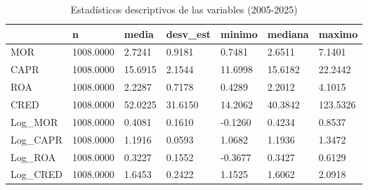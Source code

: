 \begin{table}[htbp]
\centering
\caption{Estadísticos descriptivos de las variables (2005-2025)}
\begin{tabular}{lllllll}
\hline
 & n & media & desv\_est & minimo & mediana & maximo \\
\hline
MOR & 1008.0000 & 2.7241 & 0.9181 & 0.7481 & 2.6511 & 7.1401 \\
CAPR & 1008.0000 & 15.6915 & 2.1544 & 11.6998 & 15.6182 & 22.2442 \\
ROA & 1008.0000 & 2.2287 & 0.7178 & 0.4289 & 2.2012 & 4.1015 \\
CRED & 1008.0000 & 52.0225 & 31.6150 & 14.2062 & 40.3842 & 123.5326 \\
Log\_MOR & 1008.0000 & 0.4081 & 0.1610 & -0.1260 & 0.4234 & 0.8537 \\
Log\_CAPR & 1008.0000 & 1.1916 & 0.0593 & 1.0682 & 1.1936 & 1.3472 \\
Log\_ROA & 1008.0000 & 0.3227 & 0.1552 & -0.3677 & 0.3427 & 0.6129 \\
Log\_CRED & 1008.0000 & 1.6453 & 0.2422 & 1.1525 & 1.6062 & 2.0918 \\
\hline
\end{tabular}
\label{tab:tabla1_descriptivos}
\end{table}